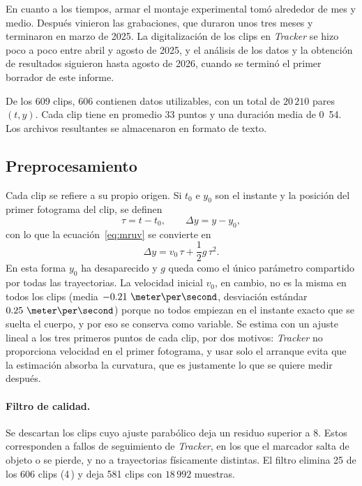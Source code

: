 \documentclass[titlepage,11pt]{article}
\providecommand{\num}[1]{\ensuremath{#1}}
\providecommand{\SI}[2]{#1\,#2}
\providecommand{\percent}{\char37\relax}
\begin{document}
En cuanto a los tiempos, armar el montaje experimental tomó alrededor de mes y
medio. Después vinieron las grabaciones, que duraron unos tres meses y
terminaron en marzo de 2025. La digitalización de los clips en \emph{Tracker}
se hizo poco a poco entre abril y agosto de 2025, y el análisis de los datos y
la obtención de resultados siguieron hasta agosto de 2026, cuando se terminó el
primer borrador de este informe.

De los 609 clips, 606 contienen datos utilizables, con un total de
\num{20\,210} pares $(t,y)$. Cada clip tiene en promedio 33 puntos y una
duración media de \unit{0.54}{\second}. Los archivos resultantes se almacenaron
en formato de texto.

\subsection{Preprocesamiento}
\label{subsec:preproceso}

Cada clip se refiere a su propio origen. Si $t_0$ e $y_0$ son el instante y la
posición del primer fotograma del clip, se definen
\begin{equation}
  \tau = t - t_0, \qquad \Delta y = y - y_0 ,
\end{equation}
con lo que la ecuación~\eqref{eq:mruv} se convierte en
\begin{equation}
  \Delta y = v_0\,\tau + \frac{1}{2}g\,\tau^2 .
  \label{eq:mruv_ref}
\end{equation}
En esta forma $y_0$ ha desaparecido y $g$ queda como el único parámetro
compartido por todas las trayectorias. La velocidad inicial $v_0$, en cambio,
no es la misma en todos los clips (media $\num{-0.21}~\meter\per\second$,
desviación estándar $\num{0.25}~\meter\per\second$) porque no todos empiezan en
el instante exacto que se suelta el cuerpo, y por eso se conserva como variable. Se
estima con un ajuste lineal a los tres primeros puntos de cada clip, por dos
motivos: \emph{Tracker} no proporciona velocidad en el primer fotograma, y usar
solo el arranque evita que la estimación absorba la curvatura, que es
justamente lo que se quiere medir después.

\paragraph{Filtro de calidad.} Se descartan los clips cuyo ajuste parabólico
deja un residuo superior a \unit{8}{\centi\meter}. Estos corresponden a fallos
de seguimiento de \emph{Tracker}, en los que el marcador salta de objeto o se
pierde, y no a trayectorias físicamente distintas. El filtro elimina 25 de los
606 clips (\SI{4}{\percent}) y deja 581 clips con \num{18\,992}
muestras.
\end{document}
